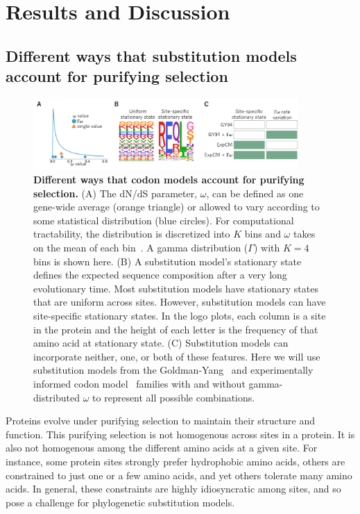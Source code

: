 \documentclass[11pt]{article}
\begin{document}
\section*{Results and Discussion}

\subsection*{Different ways that substitution models account for purifying selection}

\begin{figure}
\centerline{\includegraphics[width=0.90\textwidth]{figures/model_feature.pdf}}
\caption{\label{fig:model_feature}
\textbf{Different ways that codon models account for purifying selection.}
(A) The dN/dS parameter, $\omega$, can be defined as one gene-wide average (orange triangle) or allowed to vary according to some statistical distribution (blue circles). 
For computational tractability, the distribution is discretized into $K$ bins and $\omega$ takes on the mean of each bin~\citep{yang1994maximum,yang2000codon}. 
A gamma distribution ($\Gamma$) with $K=4$ bins is shown here.
(B) A substitution model's stationary state defines the expected sequence composition after a very long evolutionary time. 
Most substitution models have stationary states that are uniform across sites.
However, substitution models can have site-specific stationary states.
In the logo plots, each column is a site in the protein and the height of each letter is the frequency of that amino acid at stationary state. 
(C) Substitution models can incorporate neither, one, or both of these features.
Here we will use substitution models from the Goldman-Yang~\citep[GY94;][]{goldman1994codon,yang2000codon} and experimentally informed codon model~\citep[ExpCM;][]{hilton2017phydms} families with and without gamma-distributed $\omega$ to represent all possible combinations.
}
\end{figure}

Proteins evolve under purifying selection to maintain their structure and function. 
This purifying selection is not homogenous across sites in a protein.
It is also not homogenous among the different amino acids at a given site.
For instance, some protein sites strongly prefer hydrophobic amino acids, others are constrained to just one or a few amino acids, and yet others tolerate many amino acids.
In general, these constraints are highly idiosyncratic among sites, and so pose a challenge for phylogenetic substitution models.
\end{document}
